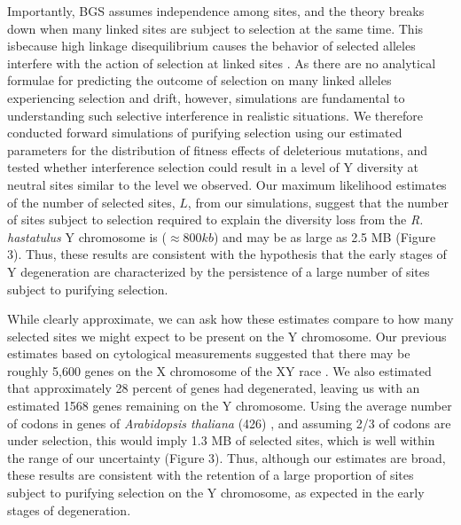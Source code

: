 \documentclass[9pt,twocolumn,twoside,lineno]{gsajnl}
\begin{document}
Importantly, BGS assumes independence among sites, and the theory breaks down when many linked sites are subject to selection at the same time. This isbecause high linkage disequilibrium causes the behavior of selected alleles interfere with the action of selection at linked sites \citep{good2014genetic,KaiserCharlesworth}. As there are no analytical formulae for predicting the outcome of selection on many linked alleles experiencing selection and drift, however, simulations are fundamental to understanding such selective interference in realistic situations. We therefore conducted forward simulations of purifying selection using our estimated parameters for the distribution of fitness effects of deleterious mutations, and tested whether interference selection could result in a level of Y diversity at neutral sites similar to the level we observed.  Our maximum likelihood estimates of the number of selected sites, $L$, from our simulations, suggest that the number of sites subject to selection required to explain the diversity loss from the \textit{R. hastatulus} Y chromosome is ($\approx 800 kb$) and may be as large as 2.5 MB (Figure 3). Thus, these results are consistent with the hypothesis that the early stages of Y degeneration are characterized by the persistence of a large number of sites subject to purifying selection.

While clearly approximate, we can ask how these estimates compare to how many selected sites we might expect to be present on the Y chromosome. Our previous estimates based on cytological measurements suggested that there may be roughly 5,600 genes on the X chromosome of the XY race \citep{hough2014}. We also estimated that approximately 28 percent of genes had degenerated, leaving us with an estimated 1568 genes remaining on the Y chromosome. Using the average number of codons in genes of \textit{Arabidopsis thaliana} (426) \citep{wortman2003annotation}, and assuming 2/3 of codons are under selection, this would imply 1.3 MB of selected sites, which is well within the range of our uncertainty (Figure 3). Thus, although our estimates are broad, these results are consistent with the retention of a large proportion of sites subject to purifying selection on the Y chromosome, as expected in the early stages of degeneration.
\end{document}
